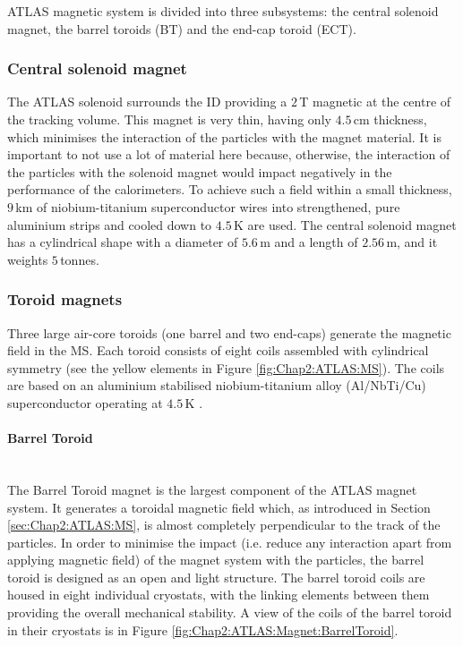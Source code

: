 ATLAS magnetic system is divided into three subsystems: the central solenoid magnet, the barrel toroids (BT) and the end-cap toroid (ECT).

\subsubsection{Central solenoid magnet}
The ATLAS solenoid surrounds the ID  providing a $2\,$T magnetic at the centre of the tracking volume. 
This magnet is very thin, having only $4.5\,$cm thickness, which 
minimises the interaction of the particles with the magnet material. It is important to not use a lot 
of material here because, otherwise, the interaction of the particles with
the solenoid magnet would impact negatively in the performance of the calorimeters.
To achieve such a field within a small thickness, $9\,$km of niobium-titanium superconductor wires 
into strengthened, pure aluminium strips  and cooled down to $4.5\,$K are used.
The central solenoid magnet has a cylindrical shape with a diameter of $5.6\,$m and a length of $2.56\,$m, and it weights $5\,$tonnes.

\subsubsection{Toroid magnets}
Three large air-core toroids (one barrel and two end-caps) generate the magnetic field in the MS. %
Each toroid consists of eight coils assembled with cylindrical symmetry (see the yellow elements in Figure \ref{fig:Chap2:ATLAS:MS}).
The coils are based on an aluminium stabilised niobium-titanium alloy (Al/NbTi/Cu) superconductor operating
at $4.5\,$K \cite{CERN-LHCC-97-018}.%


\paragraph{Barrel Toroid} \mbox{}\\
The Barrel Toroid magnet is the largest component of the ATLAS magnet system.  It generates a toroidal magnetic field which,
as introduced in Section \ref{sec:Chap2:ATLAS:MS},  is almost completely perpendicular to the track of the particles. 
In order to minimise the impact (i.e. reduce any interaction apart from applying magnetic field) of the magnet system with the particles, 
the barrel toroid is designed as an open and light structure.
The barrel toroid coils are housed in eight individual cryostats, with the linking elements
between them providing the overall mechanical stability. A view of the coils of the barrel toroid in their cryostats is in Figure \ref{fig:Chap2:ATLAS:Magnet:BarrelToroid}.

